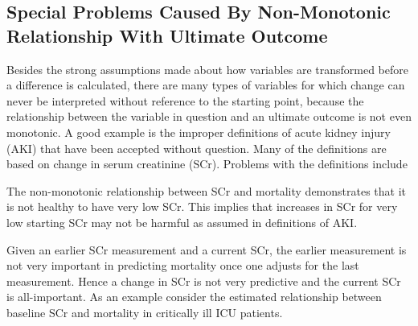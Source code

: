 \subsection{Special Problems Caused By Non-Monotonic Relationship With Ultimate Outcome}
Besides the strong assumptions made about how variables are
transformed before a difference is calculated, there are many types of
variables for which change can never be interpreted without reference
to the starting point, because the relationship between the variable
in question and an ultimate outcome is not even monotonic.  A good
example is the improper definitions of acute kidney injury (AKI) that have
been accepted without question.  Many of the definitions are based on
change in serum creatinine (SCr).  Problems with the definitions include
\be
\item The non-monotonic relationship between SCr and mortality
  demonstrates that it is not healthy to have very low SCr.  This implies
  that increases in SCr for very low starting SCr may not be harmful as assumed in definitions of AKI.
\item Given an earlier SCr measurement and a current SCr, the earlier
  measurement is not very important in predicting mortality once one
  adjusts for the last measurement.  Hence a change in SCr is not very
  predictive and the current SCr is all-important.
\ee
As an example consider the estimated relationship between baseline SCr
and mortality in critically ill ICU patients.
